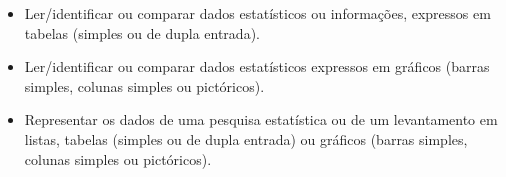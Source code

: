 

\begin{itemize}
\item Ler/identificar ou comparar dados estatísticos ou informações,
expressos em tabelas (simples ou de dupla entrada).

\item Ler/identificar ou comparar dados estatísticos expressos em gráficos
(barras simples, colunas simples ou pictóricos).

\item Representar os dados de uma pesquisa estatística ou de um levantamento
em listas, tabelas (simples ou de dupla entrada) ou gráficos (barras
simples, colunas simples ou pictóricos).
\end{itemize}


